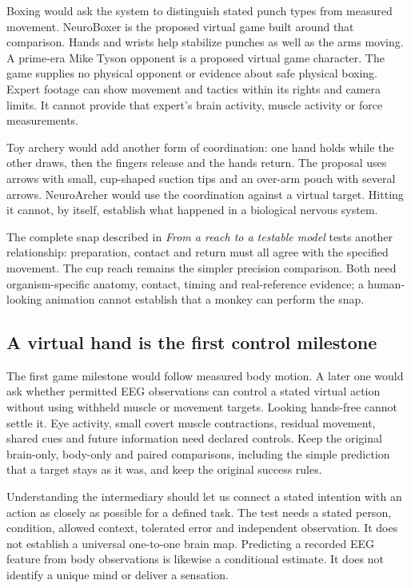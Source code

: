 Boxing would ask the system to distinguish stated punch types from measured
movement. NeuroBoxer is the proposed virtual game built around that comparison.
Hands and wrists help stabilize punches as well as the arms moving. A prime-era
Mike Tyson opponent is a proposed virtual game character. The game supplies no
physical opponent or evidence about safe physical boxing. Expert footage can show
movement and tactics within its rights and camera limits. It cannot provide
that expert's brain activity, muscle activity or force measurements.

Toy archery would add another form of coordination: one hand holds while the
other draws, then the fingers release and the hands return. The proposal uses
arrows with small, cup-shaped suction tips and an over-arm pouch with several
arrows. NeuroArcher would use the coordination
against a virtual target. Hitting it cannot, by itself, establish what happened
in a biological nervous system.

The complete snap described in \emph{From a reach to a testable model} tests another
relationship: preparation, contact and return must all agree with the specified
movement. The cup reach remains the simpler precision comparison. Both need
organism-specific anatomy, contact, timing and real-reference evidence; a
human-looking animation cannot establish that a monkey can perform the snap.

\subsection{A virtual hand is the first control milestone}

The first game milestone would follow measured body motion. A later one would
ask whether permitted EEG observations can control a stated virtual action
without using withheld muscle or movement targets. Looking hands-free cannot
settle it. Eye activity, small covert muscle contractions, residual movement,
shared cues and future information need declared controls. Keep the original
brain-only, body-only and paired comparisons, including the simple prediction
that a target stays as it was, and keep the original success rules.

Understanding the intermediary should let us connect a stated intention with
an action as closely as possible for a defined task. The test needs a stated
person, condition, allowed context, tolerated error and independent observation.
It does not establish a universal one-to-one brain map. Predicting a recorded
EEG feature from body observations is likewise a conditional estimate. It does
not identify a unique mind or deliver a sensation.

